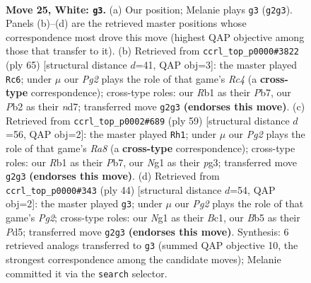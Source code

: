 \documentclass[11pt]{article}
\begin{document}
\clearpage

\begin{figure}[p]\centering
\begin{subfigure}{0.46\textwidth}\centering
\resizebox{\linewidth}{!}{%
\newchessgame
\chessboard[
  setfen={rn5r/8/7k/pB1p1p1p/8/4K3/PP4P1/1R4N1 w - - 0 25},
  showmover=false,
  pgfstyle=straightmove, color=movearrow, markmove={g2-g3}
]}
\caption{}
\end{subfigure}\hfill
\begin{subfigure}{0.46\textwidth}\centering
\resizebox{\linewidth}{!}{%
\newchessgame
\chessboard[
  setfen={6k1/1p1N3p/6p1/2r2n2/p7/7P/PP1R1KP1/8 b - - 5 33},
  showmover=false,
  pgfstyle=straightmove, color=movearrow, markmove={c5-c6}
]}
\caption{}
\end{subfigure}
\\[4pt]
\begin{subfigure}{0.46\textwidth}\centering
\resizebox{\linewidth}{!}{%
\newchessgame
\chessboard[
  setfen={5k2/1p6/8/b4P2/4K3/1P4PP/2P1R3/r7 b - - 0 30},
  showmover=false,
  pgfstyle=straightmove, color=movearrow, markmove={a1-h1}
]}
\caption{}
\end{subfigure}\hfill
\begin{subfigure}{0.46\textwidth}\centering
\resizebox{\linewidth}{!}{%
\newchessgame
\chessboard[
  setfen={4k2r/1R2bpp1/p2p4/3P3p/8/8/P3K1PP/2B5 w k - 0 23},
  showmover=false,
  pgfstyle=straightmove, color=movearrow, markmove={g2-g3}
]}
\caption{}
\end{subfigure}
\caption{\textbf{Move 25, White: \texttt{g3}.} (a) Our position; Melanie plays \texttt{g3} (\texttt{g2g3}). Panels (b)--(d) are the retrieved master positions whose correspondence most drove this move (highest QAP objective among those that transfer to it). (b) Retrieved from \texttt{ccrl\_top\_p0000\#3822} (ply 65) [structural distance $d$=41, QAP obj=3]: the master played \texttt{Rc6}; under $\mu$ our \emph{Pg2} plays the role of that game's \emph{Rc4} (a \textbf{cross-type} correspondence); cross-type roles: our \emph{R}b1 as their \emph{P}b7, our \emph{P}b2 as their \emph{n}d7; transferred move \texttt{g2g3} \textbf{(endorses this move)}. (c) Retrieved from \texttt{ccrl\_top\_p0002\#689} (ply 59) [structural distance $d$=56, QAP obj=2]: the master played \texttt{Rh1}; under $\mu$ our \emph{Pg2} plays the role of that game's \emph{Ra8} (a \textbf{cross-type} correspondence); cross-type roles: our \emph{R}b1 as their \emph{P}b7, our \emph{N}g1 as their \emph{p}g3; transferred move \texttt{g2g3} \textbf{(endorses this move)}. (d) Retrieved from \texttt{ccrl\_top\_p0000\#343} (ply 44) [structural distance $d$=54, QAP obj=2]: the master played \texttt{g3}; under $\mu$ our \emph{Pg2} plays the role of that game's \emph{Pg2}; cross-type roles: our \emph{N}g1 as their \emph{B}c1, our \emph{B}b5 as their \emph{P}d5; transferred move \texttt{g2g3} \textbf{(endorses this move)}. Synthesis: 6 retrieved analogs transferred to \texttt{g3} (summed QAP objective 10, the strongest correspondence among the candidate moves); Melanie committed it via the \texttt{search} selector.}
\label{fig:thought-m48}
\end{figure}
\end{document}
